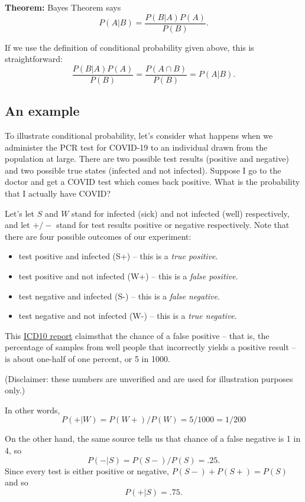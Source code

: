 \documentclass[
  11pt,
  letterpaper,
]{scrbook}
\providecommand{\tightlist}{%
  \setlength{\itemsep}{0pt}\setlength{\parskip}{0pt}}\usepackage{longtable,booktabs,array}
\theoremstyle{plain}
\theoremstyle{remark}
\begin{document}
\textbf{Theorem:} Bayes Theorem says \[
P(A|B) = \frac{P(B|A)P(A)}{P(B)}.
\]

If we use the definition of conditional probability given above, this is
straightforward: \[
\frac{P(B|A)P(A)}{P(B)} = \frac{P(A\cap B)}{P(B)} = P(A|B).
\]

\hypertarget{an-example}{%
\subsection{An example}\label{an-example}}

To illustrate conditional probability, let's consider what happens when
we administer the PCR test for COVID-19 to an individual drawn from the
population at large. There are two possible test results (positive and
negative) and two possible true states (infected and not infected).
Suppose I go to the doctor and get a COVID test which comes back
positive. What is the probability that I actually have COVID?

Let's let \(S\) and \(W\) stand for infected (sick) and not infected
(well) respectively, and let \(+/-\) stand for test results positive or
negative respectively. Note that there are four possible outcomes of our
experiment:

\begin{itemize}
\tightlist
\item
  test positive and infected (S+) -- this is a \emph{true positive}.
\item
  test positive and not infected (W+) -- this is a \emph{false
  positive}.
\item
  test negative and infected (S-) -- this is a \emph{false negative}.
\item
  test negative and not infected (W-) -- this is a \emph{true negative}.
\end{itemize}

This
\href{https://www.icd10monitor.com/false-positives-in-pcr-tests-for-covid-19}{ICD10
report} claimsthat the chance of a false positive -- that is, the
percentage of samples from well people that incorrectly yields a
positive result -- is about one-half of one percent, or 5 in 1000.

(Disclaimer: these numbers are unverified and are used for illustration
purposes only.)

In other words, \[
P(+|W) = P(W+)/P(W) = 5/1000=1/200
\]

On the other hand, the same source tells us that chance of a false
negative is 1 in 4, so \[
P(-|S) = P(S-)/P(S) = .25.
\] Since every test is either positive or negative, \(P(S-)+P(S+)=P(S)\)
and so \[
P(+|S) = .75.
\]
\end{document}
